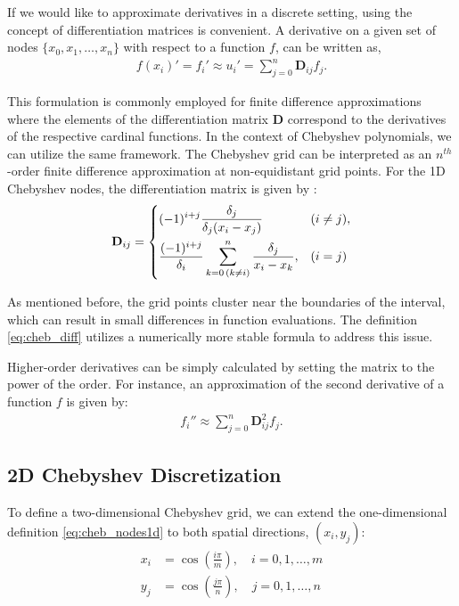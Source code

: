 If we would like to approximate derivatives in a discrete setting, using the
concept of differentiation matrices is convenient. A derivative on a given set
of nodes $\{x_0, x_1,\dots, x_n\}$ with respect to a function $f$, can be written
as,
\begin{align}
f(x_i)' = f_i' \approx u_i' = \sum_{j=0}^{n}\mathbf{D}_{ij}f_j.
\end{align}

This formulation is commonly employed for finite difference approximations
where the elements of the differentiation matrix $\mathbf{D}$ correspond to the
derivatives of the respective cardinal functions. In the context of Chebyshev
polynomials, we can utilize the same framework. The Chebyshev grid can be
interpreted as an $n^{th}$-order finite difference approximation at
non-equidistant grid points. For the 1D Chebyshev nodes, the differentiation
matrix is given by \citep{meseguer2020}:
\begin{align}
\mathbf{D}_{ij} =
\begin{dcases}
  (-1)^{i+j} \frac{\delta_j}{\delta_j(x_i - x_j)}
    & (i \neq j), \\
  \frac{(-1)^{i+j}}{\delta_i} \sum^{n}_{k=0 \, (k \neq i)}
    \frac{\delta_j}{x_i - x_k}, & (i = j)
\end{dcases}
\label{eq:cheb_diff}
\end{align}

As mentioned before, the grid points cluster near the boundaries of the
interval, which can result in small differences in function evaluations. The
definition \eqref{eq:cheb_diff} utilizes a numerically more stable formula to
address this issue.

Higher-order derivatives can be simply calculated by setting the matrix to the
power of the order. For instance, an approximation of the second derivative of
a function $f$ is given by:
\begin{align}
  f_i'' \approx \sum_{j=0}^{n}\mathbf{D}_{ij}^{2}f_j.
\end{align}

\subsection{2D Chebyshev Discretization} \label{sec:2d_cheb}

To define a two-dimensional Chebyshev grid, we can extend the one-dimensional
definition \eqref{eq:cheb_nodes1d} to both spatial directions, $(x_i, y_j)$:
\vspace{-10pt}
\begin{align} \label{eq:cheb_nodes2d}
  \begin{split}
  x_i & = \cos(\frac{i \pi}{m}), \quad i = 0,1,\dots,m \\ 
  y_j &  = \cos(\frac{j \pi}{n}), \quad j = 0,1,\dots,n
  \end{split}
\end{align}

